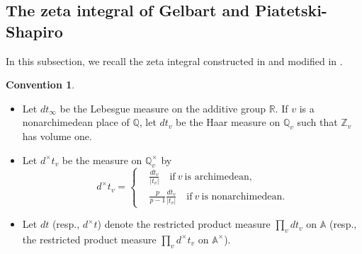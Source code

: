 \documentclass[11pt, a4paper]{amsart}
\theoremstyle{plain}
\theoremstyle{definition}
\newtheorem{convention}[theorem]{Convention}
\numberwithin{equation}{section}
\def\AAA{\mathbb{A}}
\def\QQ{\mathbb{Q}}
\def\RR{\mathbb{R}}
\def\ZZ{\mathbb{Z}}
\begin{document}
\subsection{The zeta integral of Gelbart and Piatetski-Shapiro}
\label{SS: global zeta integral}
In this subsection, we recall the zeta integral constructed in \cite{Gelbart&PS84} and modified in \cite{PS18}.

\begin{convention}
\begin{itemize}
    \item Let $dt_{\infty}$ be the Lebesgue measure on the additive group $\RR$. If $v$ is a nonarchimedean place of $\QQ$, let $dt_{v}$ be the Haar measure on $\QQ_{v}$ such that $\ZZ_{v}$ has volume one.
    \item 
    Let $d^{\times}t_{v}$ be the measure on $\QQ_{v}^{\times}$ by 
    \begin{equation*}
        d^{\times}t_{v} = \begin{cases}
                             & \frac{dt_{v}}{|t_v|} \quad \text{if} \ v \ \text{is archimedean}, \\
                             & \frac{p}{p - 1}\frac{dt_{v}}{|t_v|} \quad \text{if} \ v \ \text{is nonarchimedean}.  
                          \end{cases}
    \end{equation*}
    \item 
    Let $dt$ (resp., $d^{\times}t$) denote the restricted product measure $\prod_{v}dt_{v}$ on $\AAA$ (resp., the restricted product measure $\prod_{v}d^{\times}t_{v}$ on $\AAA^{\times}$). 
\end{itemize}
\end{convention}
\end{document}
